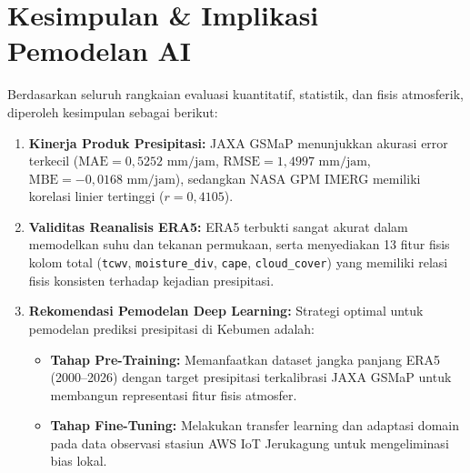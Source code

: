 \documentclass[11pt,a4paper]{article}
\begin{document}
\section{Kesimpulan \& Implikasi Pemodelan AI}
Berdasarkan seluruh rangkaian evaluasi kuantitatif, statistik, dan fisis atmosferik, diperoleh kesimpulan sebagai berikut:
\begin{enumerate}[leftmargin=*]
    \item \textbf{Kinerja Produk Presipitasi:} JAXA GSMaP menunjukkan akurasi error terkecil ($\text{MAE} = 0{,}5252\text{ mm/jam}$, $\text{RMSE} = 1{,}4997\text{ mm/jam}$, $\text{MBE} = -0{,}0168\text{ mm/jam}$), sedangkan NASA GPM IMERG memiliki korelasi linier tertinggi ($r = 0{,}4105$).
    \item \textbf{Validitas Reanalisis ERA5:} ERA5 terbukti sangat akurat dalam memodelkan suhu dan tekanan permukaan, serta menyediakan 13 fitur fisis kolom total (\texttt{tcwv}, \texttt{moisture\_div}, \texttt{cape}, \texttt{cloud\_cover}) yang memiliki relasi fisis konsisten terhadap kejadian presipitasi.
    \item \textbf{Rekomendasi Pemodelan Deep Learning:} Strategi optimal untuk pemodelan prediksi presipitasi di Kebumen adalah:
    \begin{itemize}
        \item \textbf{Tahap Pre-Training:} Memanfaatkan dataset jangka panjang ERA5 (2000--2026) dengan target presipitasi terkalibrasi JAXA GSMaP untuk membangun representasi fitur fisis atmosfer.
        \item \textbf{Tahap Fine-Tuning:} Melakukan transfer learning dan adaptasi domain pada data observasi stasiun AWS IoT Jerukagung untuk mengeliminasi bias lokal.
    \end{itemize}
\end{enumerate}
\end{document}
